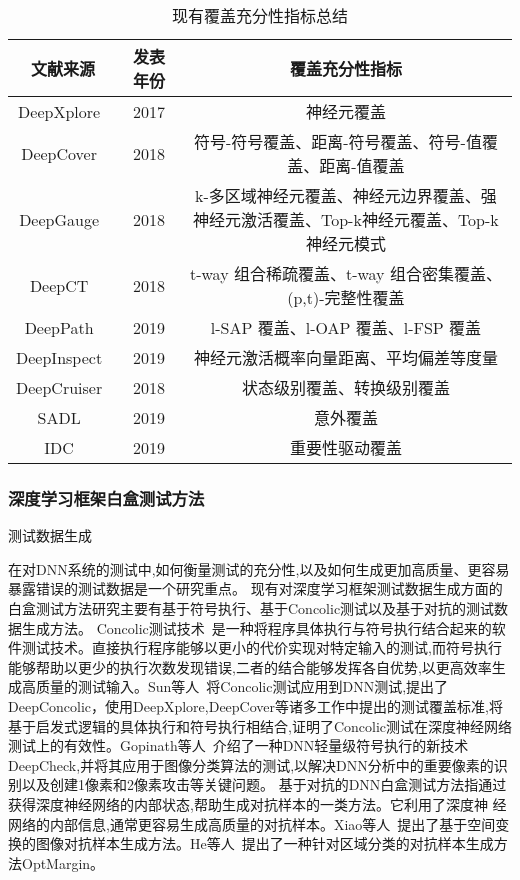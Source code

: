 \begin{table}[t]
	\small
	\centering
	\caption{现有覆盖充分性指标总结}
	\label{tab:coverage_criteria}
	\begin{tabular}{c|c|c}
		\toprule
		文献来源 & 发表年份 & 覆盖充分性指标 \\
		\midrule
		DeepXplore~\citess{Pei2019DeepXplore} & 2017 & 神经元覆盖 \\
		\midrule
	    DeepCover~\citess{Sun2018Testing} & 2018 & 符号-符号覆盖、距离-符号覆盖、符号-值覆盖、距离-值覆盖 \\
		\midrule
		DeepGauge~\citess{ma2018deepgauge} & 2018 & k-多区域神经元覆盖、神经元边界覆盖、强神经元激活覆盖、Top-k神经元覆盖、Top-k 神经元模式 \\
		\midrule
	    DeepCT~\citess{ma2019deepct} & 2018 & t-way 组合稀疏覆盖、t-way 组合密集覆盖、(p,t)-完整性覆盖 \\
	    \midrule
	    DeepPath~\citess{Wang2019DeepPath} & 2019 & l-SAP 覆盖、l-OAP 覆盖、l-FSP 覆盖 \\
	    \midrule
	    DeepInspect~\citess{Tian2019Testing} & 2019 & 神经元激活概率向量距离、平均偏差等度量 \\
	    \midrule
	    DeepCruiser~\citess{Du2018DeepCruiser} & 2018 & 状态级别覆盖、转换级别覆盖 \\
	    \midrule
	    SADL~\citess{Kim2019Guiding} & 2019 & 意外覆盖 \\
	    \midrule
	    IDC~\citess{Gerasimou2020Importance} & 2019 & 重要性驱动覆盖 \\
		\bottomrule
	\end{tabular}
\end{table}



\subsubsection{深度学习框架白盒测试方法}


测试数据生成

在对DNN系统的测试中,如何衡量测试的充分性,以及如何生成更加高质量、更容易暴露错误的测试数据是一个研究重点。
现有对深度学习框架测试数据生成方面的白盒测试方法研究主要有基于符号执行、基于Concolic测试以及基于对抗的测试数据生成方法。
Concolic测试技术~\cite{Majumdar2007Hybrid}是一种将程序具体执行与符号执行结合起来的软件测试技术。直接执行程序能够以更小的代价实现对特定输入的测试,而符号执行能够帮助以更少的执行次数发现错误,二者的结合能够发挥各自优势,以更高效率生成高质量的测试输入。Sun等人~将Concolic测试应用到DNN测试,提出了DeepConcolic，使用DeepXplore,DeepCover等诸多工作中提出的测试覆盖标准,将基于启发式逻辑的具体执行和符号执行相结合,证明了Concolic测试在深度神经网络测试上的有效性。Gopinath等人~介绍了一种DNN轻量级符号执行的新技术DeepCheck,并将其应用于图像分类算法的测试,以解决DNN分析中的重要像素的识别以及创建1像素和2像素攻击等关键问题。
基于对抗的DNN白盒测试方法指通过获得深度神经网络的内部状态,帮助生成对抗样本的一类方法。它利用了深度神
经网络的内部信息,通常更容易生成高质量的对抗样本。Xiao等人~提出了基于空间变换的图像对抗样本生成方法。He等人~提出了一种针对区域分类的对抗样本生成方法OptMargin。




